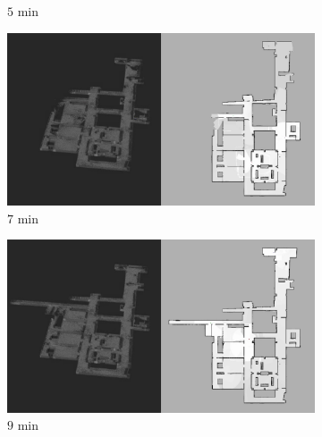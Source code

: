 \documentclass[smallextended]{svjour3}       %
\begin{document}
\begin{figure}[!t]
\begin{subfigure}[t]{0.38\columnwidth}
        		\caption{$5$ min}
		\vspace*{0.05\textwidth}
    	\end{subfigure}
	\hspace*{0.05\textwidth}
    	\begin{subfigure}[t]{0.38\columnwidth}
           	\centering
          	\includegraphics[trim={0cm 0cm 35cm 0cm}, clip, width=\textwidth]{Patrol_Split_Screen_7min.jpg}
        		\caption{$7$ min}
		\vspace*{0.05\textwidth}
    	\end{subfigure}
    	\begin{subfigure}[t]{0.38\columnwidth}
           	\centering
          	\includegraphics[trim={0cm 0cm 35cm 0cm}, clip, width=\textwidth]{Patrol_Split_Screen_9min.jpg}
        		\caption{$9$ min}
		\vspace*{0.05\textwidth}
    	\end{subfigure}
	\hspace*{0.05\textwidth}
    	\begin{subfigure}[t]{0.38\columnwidth}
           	\centering

\end{subfigure}
\end{figure}
\end{document}

